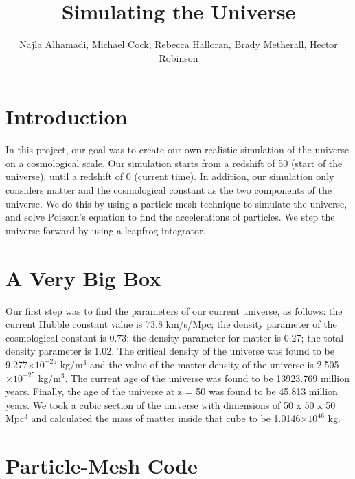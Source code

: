 \documentclass[10pt]{article}
\title{Simulating the Universe}
\author{Najla Alhamadi, Michael Cock, Rebecca Halloran, Brady Metherall, Hector Robinson}
\providecommand{\e}[1]{\ensuremath{\times 10^{#1}}}
\begin{document}
\maketitle
\section{Introduction}
	In this project, our goal was to create our own realistic simulation of the universe on a cosmological scale. Our simulation starts from a redshift of 50 (start of the universe), until a redshift of 0 (current time). In addition, our simulation only considers matter and the cosmological constant as the two components of the universe. We do this by using a particle mesh technique to simulate the universe, and solve Poisson's equation to find the accelerations of particles. We step the universe forward by using a leapfrog integrator.
	
\section{A Very Big Box}
	Our first step was to find the parameters of our current universe, as follows: the current Hubble constant value is 73.8 km/s/Mpc; the density parameter of the cosmological constant is 0.73; the density parameter for matter is 0.27; the total density parameter is 1.02. The critical density of the universe was found to be 9.277\e{-25} kg/m$^3$ and the value of the matter density of the universe is 2.505\e{-25} kg/m$^3$. The current age of the universe was found to be 13923.769 million years. Finally, the age of the universe at z = 50 was found to be 45.813 million years. We took a cubic section of the universe with dimensions of 50 x 50 x 50 Mpc$^3$ and calculated the mass of matter inside that cube to be 1.0146\e{46} kg.  
	
\section{Particle-Mesh Code}
\end{document}
